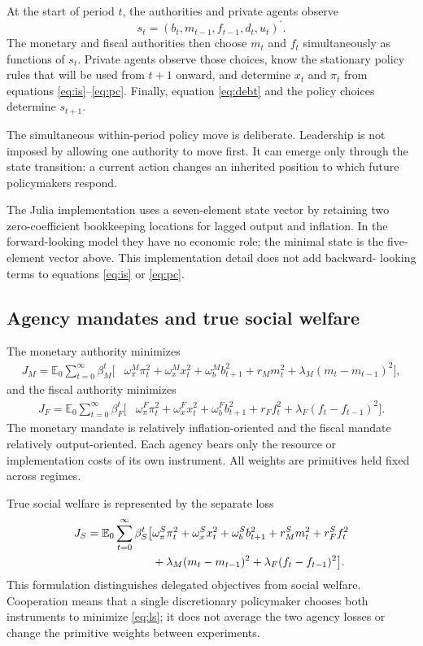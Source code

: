 \documentclass[11pt]{article}
\newcommand{\E}{\mathbb{E}}
\newcommand{\trans}{^{\prime}}
\begin{document}
At the start of period $t$, the authorities and private agents observe
\begin{equation}
s_t=(b_t,m_{t-1},f_{t-1},d_t,u_t)\trans.
\end{equation}
The monetary and fiscal authorities then choose $m_t$ and $f_t$
simultaneously as functions of $s_t$. Private agents observe those choices,
know the stationary policy rules that will be used from $t+1$ onward, and
determine $x_t$ and $\pi_t$ from equations \eqref{eq:is}--\eqref{eq:pc}.
Finally, equation \eqref{eq:debt} and the policy choices determine $s_{t+1}$.

The simultaneous within-period policy move is deliberate. Leadership is not
imposed by allowing one authority to move first. It can emerge only through
the state transition: a current action changes an inherited position to which
future policymakers respond.

The Julia implementation uses a seven-element state vector by retaining two
zero-coefficient bookkeeping locations for lagged output and inflation. In the
forward-looking model they have no economic role; the minimal state is the
five-element vector above. This implementation detail does not add backward-
looking terms to equations \eqref{eq:is} or \eqref{eq:pc}.

\subsection{Agency mandates and true social welfare}

The monetary authority minimizes
\begin{align}
J_M=\E_0\sum_{t=0}^{\infty}\beta_M^t\bigl[
  &\omega^M_\pi\pi_t^2+\omega^M_xx_t^2+\omega^M_bb_{t+1}^2
  +r_Mm_t^2+\lambda_M(m_t-m_{t-1})^2\bigr],               \label{eq:lm}
\end{align}
and the fiscal authority minimizes
\begin{align}
J_F=\E_0\sum_{t=0}^{\infty}\beta_F^t\bigl[
  &\omega^F_\pi\pi_t^2+\omega^F_xx_t^2+\omega^F_bb_{t+1}^2
  +r_Ff_t^2+\lambda_F(f_t-f_{t-1})^2\bigr].               \label{eq:lf}
\end{align}
The monetary mandate is relatively inflation-oriented and the fiscal mandate
relatively output-oriented. Each agency bears only the resource or
implementation costs of its own instrument. All weights are primitives held
fixed across regimes.

True social welfare is represented by the separate loss
\begin{align}
J_S=\E_0\sum_{t=0}^{\infty}\beta_S^t\bigl[
 &\omega^S_\pi\pi_t^2+\omega^S_xx_t^2+\omega^S_bb_{t+1}^2
 +r^S_Mm_t^2+r^S_Ff_t^2 \notag\\
 &+\lambda_M(m_t-m_{t-1})^2
 +\lambda_F(f_t-f_{t-1})^2\bigr].                         \label{eq:ls}
\end{align}
This formulation distinguishes delegated objectives from social welfare.
Cooperation means that a single discretionary policymaker chooses both
instruments to minimize \eqref{eq:ls}; it does not average the two agency
losses or change the primitive weights between experiments.
\end{document}
